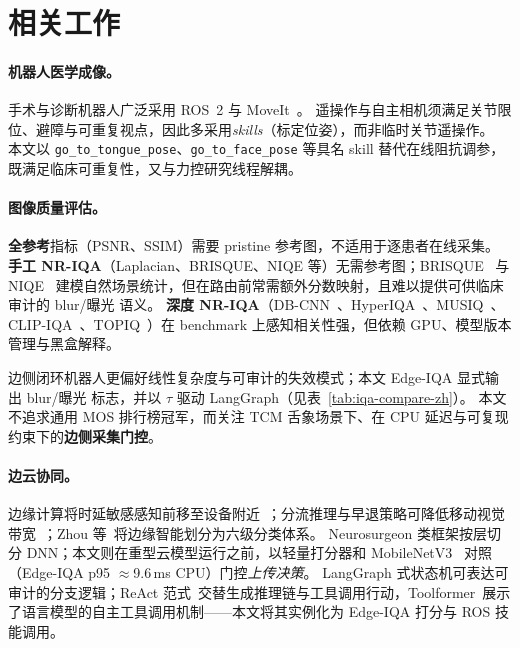 \section{相关工作}
\label{sec:related-zh}

\paragraph{机器人医学成像。}
手术与诊断机器人广泛采用 ROS~2 与 MoveIt~\cite{moore2021ros2,chitta2009moveit}。
遥操作与自主相机须满足关节限位、避障与可重复视点，因此多采用\emph{skills}（标定位姿），而非临时关节遥操作。
本文以 \texttt{go\_to\_tongue\_pose}、\texttt{go\_to\_face\_pose} 等具名 skill 替代在线阻抗调参，既满足临床可重复性，又与力控研究线程解耦。

\paragraph{图像质量评估。}
\textbf{全参考}指标（PSNR、SSIM）需要 pristine 参考图，不适用于逐患者在线采集。
\textbf{手工 NR-IQA}（Laplacian、BRISQUE、NIQE 等）无需参考图；BRISQUE~\cite{mittal2012brisque} 与 NIQE~\cite{mittal2012niqe} 建模自然场景统计，但在路由前常需额外分数映射，且难以提供可供临床审计的 blur/曝光 语义。
\textbf{深度 NR-IQA}（DB-CNN~\cite{zhang2018blind}、HyperIQA~\cite{su2020hyperiqa}、MUSIQ~\cite{ke2021musiq}、CLIP-IQA~\cite{wang2023clipiqa}、TOPIQ~\cite{chen2024topiq}）在 benchmark 上感知相关性强，但依赖 GPU、模型版本管理与黑盒解释。

边侧闭环机器人更偏好线性复杂度与可审计的失效模式；本文 Edge-IQA 显式输出 blur/曝光 标志，并以 $\tau$ 驱动 LangGraph（见表~\ref{tab:iqa-compare-zh}）。
本文不追求通用 MOS 排行榜冠军，而关注 TCM 舌象场景下、在 CPU 延迟与可复现约束下的\textbf{边侧采集门控}。

\paragraph{边云协同。}
边缘计算将时延敏感感知前移至设备附近~\cite{wang2014edge}；分流推理与早退策略可降低移动视觉带宽~\cite{kang2017neurosurgeon,li2018edge}；Zhou 等~\cite{zhou2019edge}将边缘智能划分为六级分类体系。
Neurosurgeon 类框架按层切分 DNN；本文则在重型云模型运行之前，以轻量打分器和 MobileNetV3~\cite{howard2019mobilenetv3} 对照（Edge-IQA p95 $\approx$9.6\,ms CPU）门控\emph{上传决策}。
LangGraph 式状态机可表达可审计的分支逻辑；ReAct 范式~\cite{yao2023react}交替生成推理链与工具调用行动，Toolformer~\cite{schick2023toolformer}展示了语言模型的自主工具调用机制——本文将其实例化为 Edge-IQA 打分与 ROS 技能调用。

